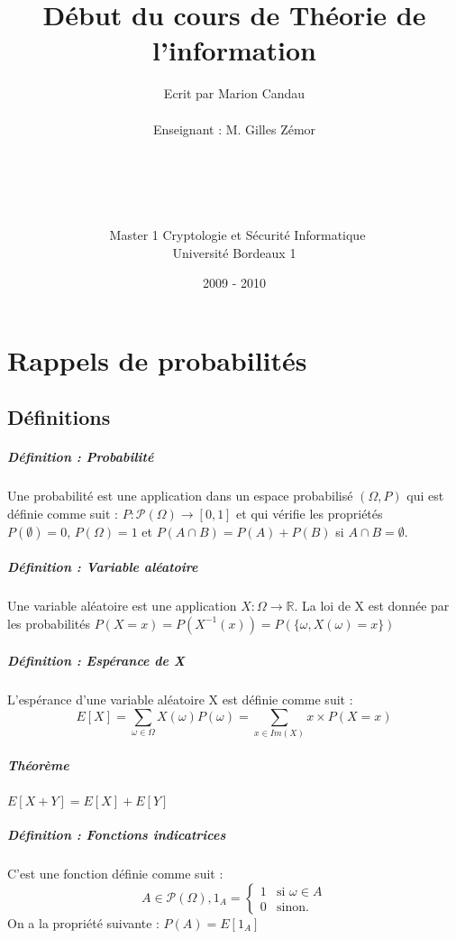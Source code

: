 \documentclass[12pt,a4paper]{report}
\title{\Huge{Début du cours de Théorie de l'information}}
\author{Ecrit par Marion Candau \\\\
Enseignant : M. Gilles Zémor\\\\\\\\\\\\\
Master 1 Cryptologie et Sécurité Informatique\\
Université Bordeaux 1}
\date{2009 - 2010}
\begin{document}
\maketitle
\tableofcontents
\newpage 

\chapter{Rappels de probabilités}
\section{Définitions}
\paragraph{Définition : Probabilité\\}
Une probabilité est une application dans un espace probabilisé $(\Omega,P) $ qui est définie comme suit :
$P:\mathcal{P}  (\Omega) \rightarrow [0,1] $
et qui vérifie les propriétés \\$ P(\emptyset)=0 $, $ P(\Omega)=1 $ et $ P(A \cap B) = P(A) + P(B) $ si $ A \cap B = \emptyset $.
\paragraph{Définition : Variable aléatoire\\}
Une variable aléatoire est une application $ X: \Omega \rightarrow \mathbb{R} $. La loi de X est donnée par les probabilités $ P(X=x) = P(X^{-1}(x)) = P(\{\omega,X(\omega)=x\}) $
\paragraph{Définition : Espérance de X\\}
L'espérance d'une variable aléatoire X est définie comme suit :
$$ E[X]=\sum_{\omega \in \Omega} X(\omega) P(\omega) = \sum_{x \in Im(X)} x\times P(X=x) $$
\paragraph{Théorème\\}
$E[X+Y]=E[X]+E[Y]$
\paragraph{Définition : Fonctions indicatrices\\}
C'est une fonction définie comme suit :
$$ A \in \mathcal{P}(\Omega),  1_A = \left\{
    \begin{array}{ll}
        1 & \mbox{si } \omega \in A \\
        0 & \mbox{sinon.}
    \end{array}
\right.
$$
On a la propriété suivante : $ P(A) = E[1_A] $
\end{document}
